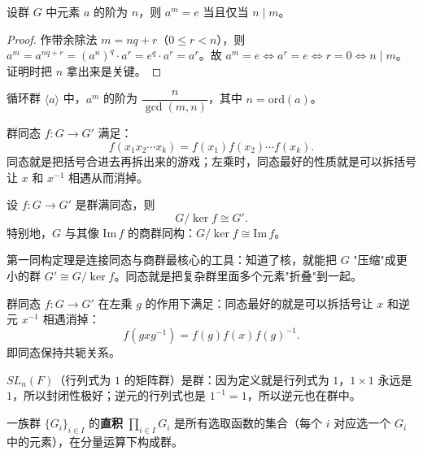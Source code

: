\begin{proposition}[命题 1.2.6：带余除法与阶的关系]
设群 $G$ 中元素 $a$ 的阶为 $n$，则 $a^m = e$ 当且仅当 $n \mid m$。
\end{proposition}

\begin{proof}
作带余除法 $m = nq + r$（$0 \le r < n$），则 $a^m = a^{nq+r} = (a^n)^q \cdot a^r = e^q \cdot a^r = a^r$。故 $a^m = e \Leftrightarrow a^r = e \Leftrightarrow r = 0 \Leftrightarrow n \mid m$。证明时把 $n$ 拿出来是关键。
\end{proof}

\begin{corollary}
循环群 $\langle a \rangle$ 中，$a^m$ 的阶为 $\dfrac{n}{\gcd(m,n)}$，其中 $n = \mathrm{ord}(a)$。
\end{corollary}

\begin{proposition}[命题 1.17：同态就是拆括号的游戏]
群同态 $f \colon G \to G'$ 满足：
\[
  f(x_1 x_2 \cdots x_k) = f(x_1) f(x_2) \cdots f(x_k).
\]
同态就是把括号合进去再拆出来的游戏；左乘时，同态最好的性质就是可以拆括号让 $x$ 和 $x^{-1}$ 相遇从而消掉。
\end{proposition}

\begin{theorem}[第一同构定理]
设 $f \colon G \to G'$ 是群满同态，则
\[
  G / \ker f \cong G'.
\]
特别地，$G$ 与其像 $\mathrm{Im}\, f$ 的商群同构：$G / \ker f \cong \mathrm{Im}\, f$。
\end{theorem}

\begin{note}
第一同构定理是连接同态与商群最核心的工具：知道了核，就能把 $G$ "压缩"成更小的群 $G' \cong G/\ker f$。同态就是把复杂群里面多个元素"折叠"到一起。
\end{note}

\begin{theorem}[定义 1.16：群同态的左乘性质]
群同态 $f \colon G \to G'$ 在左乘 $g$ 的作用下满足：同态最好的就是可以拆括号让 $x$ 和逆元 $x^{-1}$ 相遇消掉：
\[
  f(gxg^{-1}) = f(g) f(x) f(g)^{-1}.
\]
即同态保持共轭关系。
\end{theorem}

\begin{proposition}[命题 1.12：特殊线性群是群]
$SL_n(F)$（行列式为 $1$ 的矩阵群）是群：因为定义就是行列式为 $1$，$1 \times 1$ 永远是 $1$，所以封闭性极好；逆元的行列式也是 $1^{-1} = 1$，所以逆元也在群中。
\end{proposition}

\begin{definition}[群的直积的一族（定义 1.19, 1.20）]
一族群 $\{G_i\}_{i \in I}$ 的\textbf{直积} $\prod_{i \in I} G_i$ 是所有选取函数的集合（每个 $i$ 对应选一个 $G_i$ 中的元素），在分量运算下构成群。
\end{definition}


